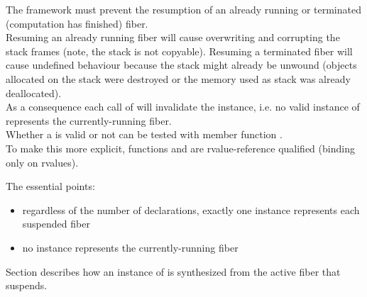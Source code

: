 \label{invalidation}

The framework must prevent the resumption of an already running or terminated
(computation has finished) fiber.\\
Resuming an already running fiber will cause overwriting and corrupting the stack
frames (note, the stack is not copyable).  Resuming a terminated fiber will
cause undefined behaviour because the stack might already be unwound (objects
allocated on the stack were destroyed or the memory used as stack was already
deallocated).\\
As a consequence each call of \resume will invalidate the \fiber instance, i.e.
no valid instance of \fiber represents the currently-running fiber.\\
Whether a \fiber is valid or not can be tested with member function \opbool.\\
To make this more explicit, functions \resume and \resumewith are
rvalue-reference qualified (binding only on rvalues).

The essential points:
\begin{itemize}
    \item regardless of the number of \fiber declarations, exactly one \fiber
          instance represents each suspended fiber
    \item no \fiber instance represents the currently-running fiber
\end{itemize}

Section  describes how an instance of \fiber is
synthesized from the active fiber that suspends.\\

